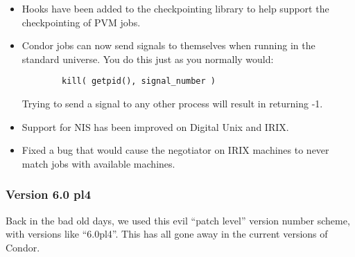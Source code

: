 \begin{itemize}
\item Hooks have been added to the checkpointing library to help
support the checkpointing of PVM jobs.

\item Condor jobs can now send signals to themselves when running in
the standard universe.
You do this just as you normally would:
\begin{verbatim}
        kill( getpid(), signal_number )
\end{verbatim}
Trying to send a signal to any other process will result in
 returning -1.

\item Support for NIS has been improved on Digital Unix and IRIX.

\item Fixed a bug that would cause the negotiator on IRIX machines to
never match jobs with available machines.  

\end{itemize}

\subsubsection{\label{sec:New-6-0-pl4}Version 6.0 pl4}

\Note Back in the bad old days, we used this evil ``patch level''
version number scheme, with versions like ``6.0pl4''.
This has all gone away in the current versions of Condor. 

